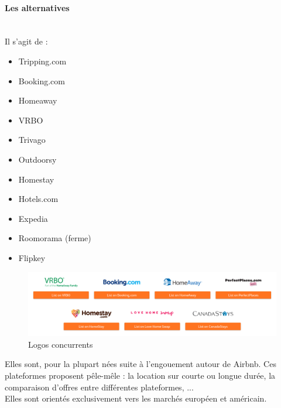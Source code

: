 \paragraph{Les alternatives }
$ $\\Il s’agit de :
\begin{itemize}
\item[\textbullet] Tripping.com
\item[\textbullet] Booking.com
\item[\textbullet] Homeaway
\item[\textbullet] VRBO
\item[\textbullet] Trivago
\item[\textbullet] Outdoorsy
\item[\textbullet] Homestay
\item[\textbullet] Hotels.com
\item[\textbullet] Expedia
\item[\textbullet] Roomorama (ferme)
\item[\textbullet] Flipkey
\end{itemize}

\newpage
\begin{figure}[H]
\begin{center}
\includegraphics[width=17cm]{images/concurrent/airalt1.png}
\end{center}
\caption{Logos concurrents}
\end{figure}

Elles sont, pour la plupart nées suite à l’engouement autour de Airbnb. Ces plateformes proposent pêle-mêle : la location sur courte ou longue durée, la comparaison d’offres entre différentes plateformes, ...
\\Elles sont orientés exclusivement vers les marchés européen et américain.

